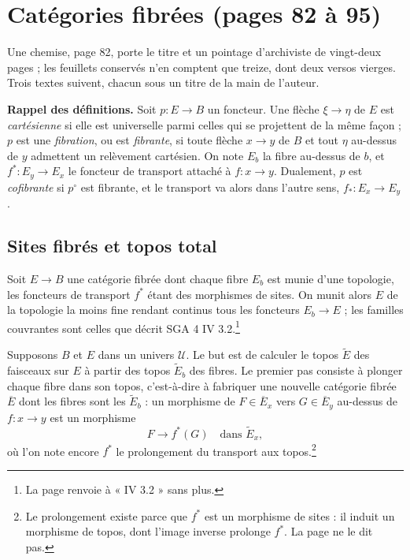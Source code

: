 \documentclass[11pt,a4paper]{article}
\begin{document}
\section*{Catégories fibrées (pages 82 à 95)}

Une chemise, page 82, porte le titre et un pointage d'archiviste de vingt-deux
pages ; les feuillets conservés n'en comptent que treize, dont deux versos
vierges. Trois textes suivent, chacun sous un titre de la main de l'auteur.


\textbf{Rappel des définitions.} Soit $p : E \to B$ un foncteur. Une
flèche $\xi \to \eta$ de $E$ est \emph{cartésienne} si elle est universelle
parmi celles qui se projettent de la même façon ; $p$ est une \emph{fibration},
ou est \emph{fibrante}, si toute flèche $x \to y$ de $B$ et tout $\eta$ au-dessus
de $y$ admettent un relèvement cartésien. On note $E_{b}$ la fibre au-dessus de
$b$, et $f^{*} : E_{y} \to E_{x}$ le foncteur de transport attaché à
$f : x \to y$. Dualement, $p$ est \emph{cofibrante} si $p^{\circ}$ est
fibrante, et le transport va alors dans l'autre sens, $f_{*} : E_{x} \to
E_{y}$.

\subsection*{Sites fibrés et topos total}

Soit $E \to B$ une catégorie fibrée dont chaque fibre $E_{b}$ est munie d'une
topologie, les foncteurs de transport $f^{*}$ étant des morphismes de sites.
On munit alors $E$ de la topologie la moins fine rendant continus tous les
foncteurs $E_{b} \to E$ ; les familles couvrantes sont celles que décrit SGA 4
IV 3.2.\footnote{La page renvoie à « IV 3.2 » sans plus.}

Supposons $B$ et $E$ dans un univers $\mathcal{U}$. Le but est de calculer le
topos $\widetilde{E}$ des faisceaux sur $E$ à partir des topos $\widetilde{E}_{b}$
des fibres. Le premier pas consiste à plonger chaque fibre dans son topos,
c'est-à-dire à fabriquer une nouvelle catégorie fibrée $\overline{E}$ dont les
fibres sont les $\widetilde{E}_{b}$ : un morphisme de $F \in \overline{E}_{x}$
vers $G \in \overline{E}_{y}$ au-dessus de $f : x \to y$ est un morphisme
\[
  F \longrightarrow f^{*}(G) \quad \text{dans } \widetilde{E}_{x} ,
\]
où l'on note encore $f^{*}$ le prolongement du transport aux
topos.\footnote{Le prolongement existe parce que $f^{*}$ est un morphisme de
sites : il induit un morphisme de topos, dont l'image inverse prolonge $f^{*}$.
La page ne le dit pas.}
\end{document}
